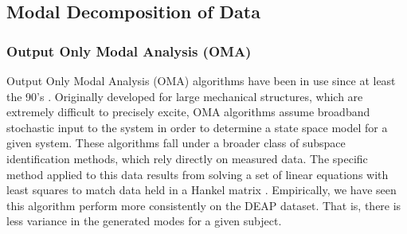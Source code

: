 \subsection{Modal Decomposition of Data}
\subsubsection{Output Only Modal Analysis (OMA)}
Output Only Modal Analysis (OMA) algorithms have been in use since at least the 90's \cite{peeters1999reference}. Originally developed for large mechanical structures, which are extremely difficult to precisely excite, OMA algorithms assume broadband stochastic input to the system in order to determine a state space model for a given system. These algorithms fall under a broader class of subspace identification methods, which rely directly on measured data. The specific method applied to this data results from solving a set of linear equations with least squares to match data held in a Hankel matrix \cite{261604}. Empirically, we have seen this algorithm perform more consistently on the DEAP dataset. That is, there is less variance in the generated modes for a given subject. 

